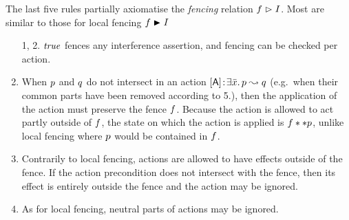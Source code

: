 The last five rules partially axiomatise the \emph{fencing} relation
 $\lass{F}\fences I$. Most are similar to those for local
fencing  $\lass{F}\strictfences I$ 
\begin{enumerate}
\item[1, 2.]
  $\mathit{true}$ fences any interference assertion, and fencing can be
  checked per action.
  \addtocounter{enumi}{2}
\item
  When $\lass{P}$ and $\lass{Q}$ do not intersect in an action $\interAss{[\token{A}]}{\bar x}{\lass{P}}{\lass{Q}} $
(e.g.\ when their common parts have
  been removed according to 5.), then the application of the action
  must preserve the fence $\lass{F}$. Because the action is allowed to
  act partly outside of $\lass{F}$, the state on which the action is
  applied is $\lass{F} ** \lass{P}$, unlike local fencing where
  $\lass{P}$ would be contained in $\lass{F}$. 
\item
  Contrarily to local fencing, actions are allowed to have effects
  outside of the fence. If the action precondition does not intersect
  with the fence, then its effect is entirely outside the fence and
  the action may be ignored.
\item
  As for local fencing, neutral parts of actions may be ignored.
\end{enumerate}


